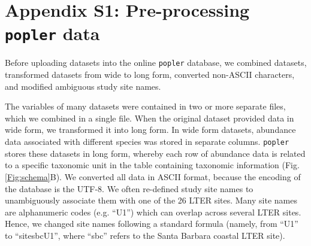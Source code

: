 \documentclass{article}\usepackage[]{graphicx}\usepackage[]{color}
\begin{document}




\newpage

\section*{Appendix S1: Pre-processing \texttt{popler} data}
Before uploading datasets into the online \texttt{popler} database, we combined datasets, transformed datasets from wide to long form, converted non-ASCII characters, and modified ambiguous study site names.


The variables of many datasets were contained in two or more separate files, which we combined in a single file. When the original dataset provided data in wide form, we transformed it into long form. In wide form datasets, abundance data associated with different species was stored in separate columns. \texttt{popler} stores these datasets in long form, whereby each row of abundance data is related to a specific taxonomic unit in the table containing taxonomic information (Fig. \ref{Fig:schema}B). We converted all data in ASCII format, because the encoding of the database is the UTF-8. We often re-defined study site names to unambiguously associate them with one of the 26 LTER sites. Many site names are alphanumeric codes (e.g. ``U1'') which can overlap across several LTER sites. Hence, we changed site names following a standard formula (namely, from ``U1'' to ``site\textunderscore sbc\textunderscore U1'', where ``sbc'' refers to the Santa Barbara coastal LTER site).
\end{document}

